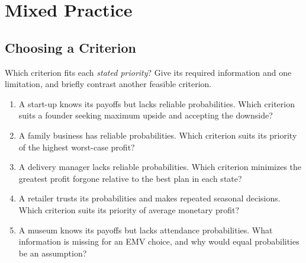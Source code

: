 \section{Mixed Practice}\label{sec:c8-mixed}

\subsection{Choosing a Criterion}\label{sec:c8-match}
Which criterion fits each \emph{stated priority}? Give its required information and one limitation, and briefly contrast another feasible criterion.
\begin{enumerate}
\item A start-up knows its payoffs but lacks reliable probabilities. Which criterion suits a founder seeking maximum upside and accepting the downside?
\item A family business has reliable probabilities. Which criterion suits its priority of the highest worst-case profit?
\item A delivery manager lacks reliable probabilities. Which criterion minimizes the greatest profit forgone relative to the best plan in each state?
\item A retailer trusts its probabilities and makes repeated seasonal decisions. Which criterion suits its priority of average monetary profit?
\item A museum knows its payoffs but lacks attendance probabilities. What information is missing for an EMV choice, and why would equal probabilities be an assumption?
\end{enumerate}
